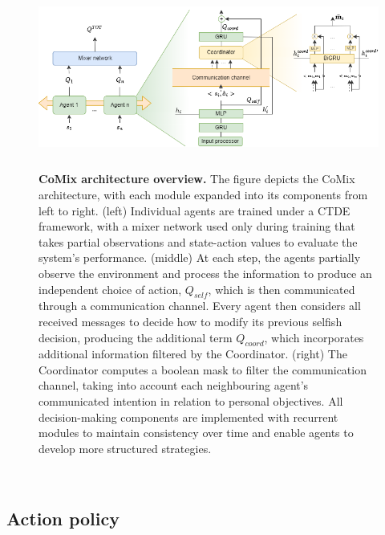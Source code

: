 \documentclass[a4paper,singleside,12pt]{report} %
\begin{document}
\begin{figure}
  \centering
  \hspace*{-0.9cm}
  \includegraphics[height=6cm]{images/pipeline.png}
  \vspace*{4mm}
  \caption{ \textbf{CoMix architecture overview.} The figure depicts the CoMix architecture, with each module expanded into its components from left to right. (left) Individual agents are trained under a CTDE framework, with a mixer network used only during training that takes partial observations and state-action values to evaluate the system's performance. (middle) At each step, the agents partially observe the environment and process the information to produce an independent choice of action, $Q_{self}$, which is then communicated through a communication channel. Every agent then considers all received messages to decide how to modify its previous selfish decision, producing the additional term $Q_{coord}$, which incorporates additional information filtered by the Coordinator. (right) The Coordinator computes a boolean mask to filter the communication channel, taking into account each neighbouring agent's communicated intention in relation to personal objectives. All decision-making components are implemented with recurrent modules to maintain consistency over time and enable agents to develop more structured strategies.}
  \label{fig:pipeline}
\end{figure}\

\subsection{Action policy}\label{action-policy}
\end{document}
